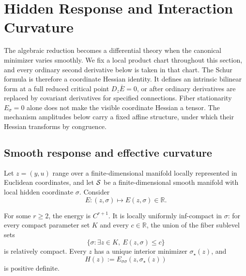 \section{Hidden Response and Interaction Curvature}
\label{sec:interaction}

The algebraic reduction becomes a differential theory when the canonical
minimizer varies smoothly.  We fix a local product chart throughout this
section, and every ordinary second derivative below is taken in that chart.
The Schur formula is therefore a coordinate Hessian identity.  It defines an
intrinsic bilinear form at a full reduced critical point
\(D_z\bar E=0\), or after ordinary derivatives are replaced by covariant
derivatives for specified connections.  Fiber stationarity
\(E_\sigma=0\) alone does not make the visible coordinate Hessian a tensor.
The mechanism amplitudes below carry a fixed affine structure, under which
their Hessian transforms by congruence.

\subsection{Smooth response and effective curvature}

Let \(z=(y,u)\) range over a finite-dimensional manifold locally represented
in Euclidean coordinates, and let \(\mathcal S\) be a finite-dimensional
smooth manifold with local hidden coordinate \(\sigma\).  Consider
\[
  E:(z,\sigma)\longmapsto E(z,\sigma)\in\mathbb R.
\]

\begin{assumption}
\label{ass:smooth-reduction}
For some \(r\ge2\), the energy is \(C^{r+1}\).  It is locally uniformly
inf-compact in \(\sigma\): for every compact parameter set \(K\) and every
\(c\in\mathbb R\), the union of the fiber sublevel sets
\[
  \{\sigma:\exists z\in K,\ E(z,\sigma)\le c\}
\]
is relatively compact.  Every \(z\) has a unique interior minimizer
\(\sigma_\star(z)\), and
\[
  H(z):=E_{\sigma\sigma}(z,\sigma_\star(z))
\]
is positive definite.
\end{assumption}

